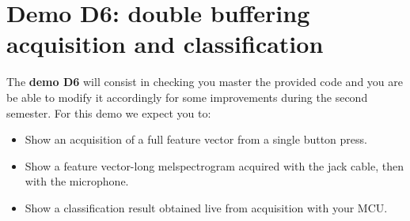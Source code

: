 \section{Demo D6: double buffering acquisition and classification}
%

The \textbf{demo D6} will consist in checking you master the provided code and you are be able to modify it accordingly for some improvements during the second semester. For this demo we expect you to:
%
\begin{itemize}
    \item Show an acquisition of a full feature vector from a single button press.
    \item Show a feature vector-long melspectrogram acquired with the jack cable, then with the microphone.
    \item Show a classification result obtained live from acquisition with your MCU.
\end{itemize}
